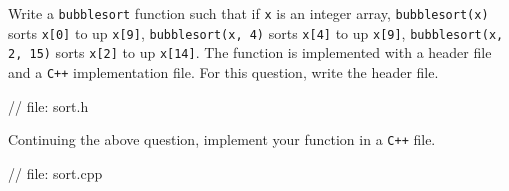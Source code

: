 

\nextq
Write a \verb!bubblesort! function such that if \verb!x! is an
integer array,
\verb!bubblesort(x)! sorts \verb!x[0]! to up \verb!x[9]!,
\verb!bubblesort(x, 4)! sorts \verb!x[4]! to up \verb!x[9]!,
\verb!bubblesort(x, 2, 15)! sorts \verb!x[2]! to up \verb!x[14]!.
The function is implemented with a header file and a \texttt{C++}
implementation file.
For this question, write the header file.
\\
\ANSWER
\begin{answercode}
// file: sort.h

\end{answercode}

\nextq
Continuing the above question, implement your function in a \texttt{C++}
file.
\\
\ANSWER
\begin{answercode}
// file: sort.cpp

\end{answercode}

